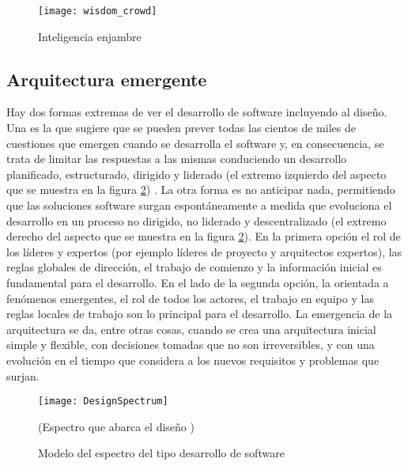\begin{figure}[h]
  \centering
  \texttt{[image: wisdom\_crowd]}
  \caption{Inteligencia enjambre}
  \centering
  \label{fig:wisdom_crowd} %
\end{figure}
\FloatBarrier %


\subsection{Arquitectura emergente}

Hay dos formas extremas de ver el desarrollo de software incluyendo al diseño. Una es la que sugiere que se pueden prever todas las cientos de miles de cuestiones que emergen cuando se desarrolla el software y, en consecuencia, se trata de limitar las respuestas a las mismas conduciendo un desarrollo planificado, estructurado, dirigido y liderado (el extremo izquierdo del aspecto que se muestra en la figura \ref{fig:DesignSpectrum}) \cite{Neal-Ford-2010}. La otra forma es no anticipar nada, permitiendo que las soluciones software surgan espontáneamente a medida que evoluciona el desarrollo en un proceso no dirigido, no liderado y descentralizado (el extremo derecho del aspecto que se muestra en la figura \ref{fig:DesignSpectrum}). En la primera opción el rol de los líderes y expertos (por ejemplo líderes de proyecto y arquitectos expertos), las reglas globales de dirección, el trabajo de comienzo y la información inicial es fundamental para el desarrollo. En el lado de la segunda opción, la orientada a fenómenos emergentes, el rol de todos los actores, el trabajo en equipo y las reglas locales de trabajo son lo principal para el desarrollo. La emergencia de la arquitectura se da, entre otras cosas, cuando se crea una arquitectura inicial simple y flexible, con decisiones tomadas que no son irreversibles, y con una evolución en el tiempo que considera a los nuevos requisitos y problemas que surjan.

\begin{figure}[h] 
  \centering
  \texttt{[image: DesignSpectrum]}
  \caption{Modelo del espectro del tipo desarrollo de software}
  (Espectro que abarca el diseño \cite{Neal-Ford-2010})
  \centering
  \label{fig:DesignSpectrum} %
\end{figure}

